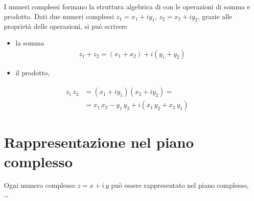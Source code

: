 \documentclass[letterpaper,10pt,english]{jupyterBook}
\begin{document}
\sphinxAtStartPar
I numeri complessi formano la struttura algebrica di  con le operazioni di somma e prodotto. Dati due numeri complessi \(z_1 = x_1 + i y_1\), \(z_2 = x_2 + i y_2\), grazie alle proprietà  delle operazioni, si può scrivere
\begin{itemize}
\item {} 
\sphinxAtStartPar
la somma
\begin{equation*}
\begin{split}z_1 + z_2 = (x_1 + x_2) + i (y_1 + y_2) \ \end{split}
\end{equation*}
\item {} 
\sphinxAtStartPar
il prodotto,

\end{itemize}
\begin{equation*}
\begin{split}\begin{aligned}
z_1 \, z_2 & = (x_1 + i y_1) (x_2 + i y_2) = \\
& = x_1 \, x_2 - y_1 \, y_2 + i ( x_1 \, y_2 + x_2 \, y_1 )
\end{aligned}\end{split}
\end{equation*}

\section{Rappresentazione nel piano complesso}
\label{\detokenize{ch/algebra/complex-algebra:rappresentazione-nel-piano-complesso}}
\sphinxAtStartPar
Ogni numero complesso \(z = x + i \, y\) può essere rappresentato nel piano complesso, … 
\end{document}
